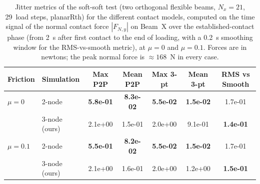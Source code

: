 \begin{table}[ht]
    \centering
    \small
    \caption{Jitter metrics of the soft-soft test (two orthogonal flexible beams, $N_x = 21$, 29~load steps, planarRth) for the different contact models, computed on the time signal of the normal contact force $|F_{N,y}|$ on Beam~X over the established-contact phase (from 2~s after first contact to the end of loading, with a 0.2~s smoothing window for the RMS-vs-smooth metric), at $\mu = 0$ and $\mu = 0.1$. Forces are in newtons; the peak normal force is $\approx 168$~N in every case.}
    \label{tab:metrics_jitter_soft_soft}
    \begin{tabular}{llccccc}
        \toprule
        Friction & Simulation & Max P2P & Mean P2P & Max 3-pt & Mean 3-pt & RMS vs Smooth \\
        \midrule
        $\mu = 0$ & 2-node & \textbf{5.8e-01} & \textbf{8.3e-02} & \textbf{5.5e-02} & \textbf{1.5e-02} & 1.7e-01 \\
         & 3-node (ours) & 2.1e+00 & 1.5e-01 & 2.0e+00 & 9.1e-01 & \textbf{1.4e-01} \\
        \midrule
        $\mu = 0.1$ & 2-node & \textbf{5.5e-01} & \textbf{8.2e-02} & \textbf{5.5e-02} & \textbf{1.5e-02} & 1.7e-01 \\
         & 3-node (ours) & 2.1e+00 & 1.6e-01 & 2.0e+00 & 1.2e+00 & \textbf{1.5e-01} \\
        \bottomrule
    \end{tabular}
\end{table}
